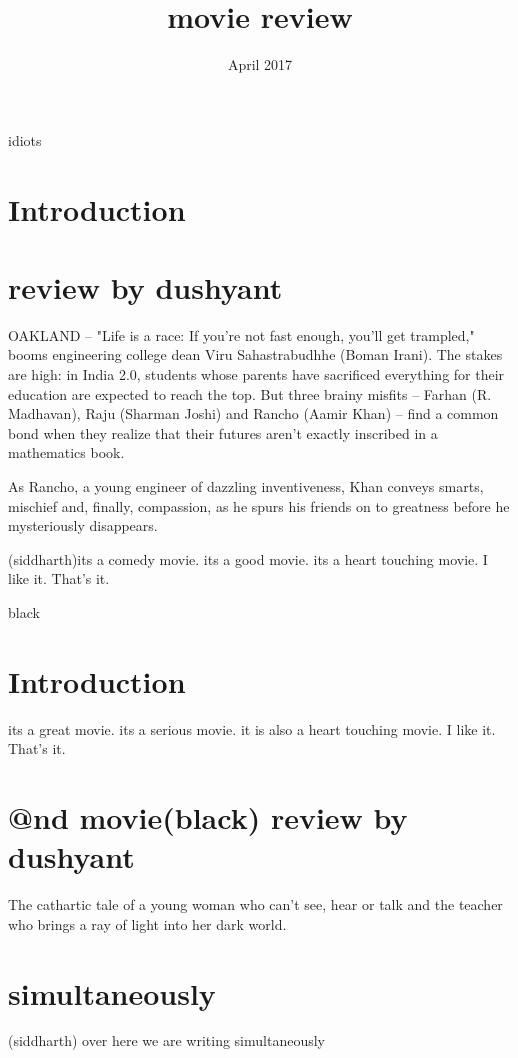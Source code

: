 \documentclass{article}
\title{movie review}
\date{April 2017}
\begin{document}
 idiots
\section{Introduction}

\section{review by dushyant}
OAKLAND -- "Life is a race: If you're not fast enough, you'll get trampled," booms engineering college dean Viru Sahastrabudhhe (Boman Irani). The stakes are high: in India 2.0, students whose parents have sacrificed everything for their education are expected to reach the top. But three brainy misfits -- Farhan (R. Madhavan), Raju (Sharman Joshi) and Rancho (Aamir Khan) -- find a common bond when they realize that their futures aren't exactly inscribed in a mathematics book.

As Rancho, a young engineer of dazzling inventiveness, Khan conveys smarts, mischief and, finally, compassion, as he spurs his friends on to greatness before he mysteriously disappears.


(siddharth)its a comedy movie. its a good movie. its a heart touching movie. I like it. That's it.  


\maketitle
black
\section{Introduction}
its a great movie. its a serious movie. it is also a heart touching movie. I like it. That's it.

\section{@nd movie(black) review by dushyant}
The cathartic tale of a young woman who can't see, hear or talk and the teacher who brings a ray of light into her dark world.


\section{simultaneously}
(siddharth) over here we are writing simultaneously
\end{document}
